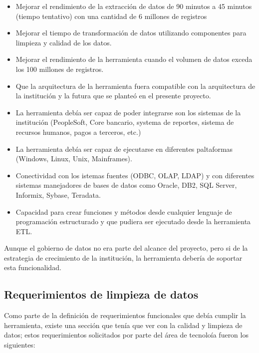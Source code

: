 \documentclass[a4paper,openright,12pt]{book}
\begin{document}
\begin{itemize}

\item Mejorar el rendimiento de la extracción de datos de 90 minutos a 45
  minutos (tiempo tentativo) con una cantidad de 6 millones de registros

\item Mejorar el tiempo de transformación de datos utilizando componentes para
  limpieza y calidad de los datos.

\item Mejorar el rendimiento de la herramienta cuando el volumen de datos exceda
  los 100 millones de registros.

\item Que la arquitectura de la herramienta fuera compatible con la arquitectura
  de la institución y la futura que se planteó en el presente proyecto.

\item La herramienta debía ser capaz de poder integrarse son los sistemas de la
  institución (PeopleSoft, Core bancario, systema de reportes, sistema de
  recursos humanos, pagos a terceros, etc.)

\item La herramienta debía ser capaz de ejecutarse en diferentes paltaformas
  (Windows, Linux, Unix, Mainframes).

\item Conectividad con los istemas fuentes (ODBC, OLAP, LDAP) y con diferentes
  sistemas manejadores de bases de datos como Oracle, DB2, SQL Server, Informix,
  Sybase, Teradata.

\item Capacidad para crear funciones y métodos desde cualquier lenguaje de
  programación estructurado y que pudiera ser ejecutado desde la herramienta
  ETL.
\end{itemize}

Aunque el gobierno de datos no era parte del alcance del proyecto, pero si de la
estrategia de crecimiento de la institución, la herramienta debería de soportar
esta funcionalidad.

\subsection{Requerimientos de limpieza de datos}

Como parte de la definición de requerimientos funcionales que debía cumplir la
herramienta, existe una sección que tenía que ver con la calidad y limpieza de
datos; estos requerimientos solicitados por parte del área de tecnoloía fueron
los siguientes:
\end{document}
